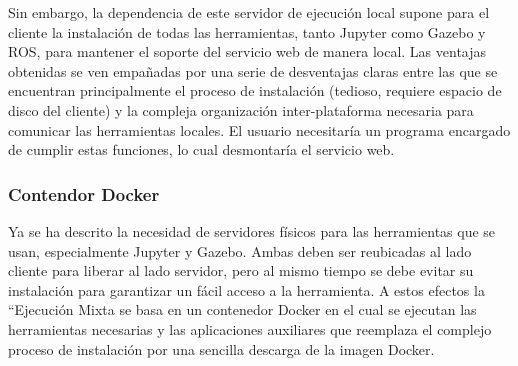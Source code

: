 Sin embargo, la dependencia de este servidor de ejecución local supone para el cliente la instalación de todas las herramientas, tanto Jupyter como Gazebo y ROS, para mantener el soporte del servicio web de manera local. Las ventajas obtenidas se ven empañadas por una serie de desventajas claras entre las que se encuentran principalmente el proceso de instalación (tedioso, requiere espacio de disco del cliente) y la compleja organización inter-plataforma necesaria para comunicar las herramientas locales. El usuario necesitaría un programa encargado de cumplir estas funciones, lo cual desmontaría el servicio web.

\subsubsection{Contendor Docker}

Ya se ha descrito la necesidad de servidores físicos para las herramientas que se usan, especialmente Jupyter y Gazebo. Ambas deben ser reubicadas al lado cliente para liberar al lado servidor, pero al mismo tiempo se debe evitar su instalación para garantizar un fácil acceso a la herramienta. A estos efectos la ``Ejecución Mixta se basa en un contenedor Docker en el cual se ejecutan las herramientas necesarias y las aplicaciones auxiliares que reemplaza el complejo proceso de instalación por una sencilla descarga de la imagen Docker.

